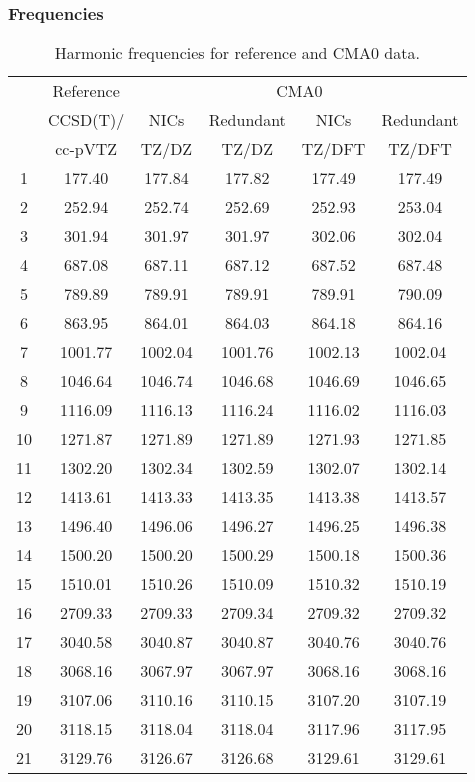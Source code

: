 \documentclass[10pt,oneside]{article}
\begin{document}
\begin{table}[h!]
\subsubsection*{Frequencies}
\centering
\caption{Harmonic frequencies for reference and CMA0 data.}
\begin{tabular}{cccccc}
\toprule
{} & Reference & \multicolumn{4}{c}{CMA0} \\
{} &  CCSD(T)/ &    NICs &  Redundant &    NICs & Redundant \\
{} &   cc-pVTZ &   TZ/DZ &      TZ/DZ &  TZ/DFT &    TZ/DFT \\
\midrule
1  &    177.40 &  177.84 &     177.82 &  177.49 &    177.49 \\
2  &    252.94 &  252.74 &     252.69 &  252.93 &    253.04 \\
3  &    301.94 &  301.97 &     301.97 &  302.06 &    302.04 \\
4  &    687.08 &  687.11 &     687.12 &  687.52 &    687.48 \\
5  &    789.89 &  789.91 &     789.91 &  789.91 &    790.09 \\
6  &    863.95 &  864.01 &     864.03 &  864.18 &    864.16 \\
7  &   1001.77 & 1002.04 &    1001.76 & 1002.13 &   1002.04 \\
8  &   1046.64 & 1046.74 &    1046.68 & 1046.69 &   1046.65 \\
9  &   1116.09 & 1116.13 &    1116.24 & 1116.02 &   1116.03 \\
10 &   1271.87 & 1271.89 &    1271.89 & 1271.93 &   1271.85 \\
11 &   1302.20 & 1302.34 &    1302.59 & 1302.07 &   1302.14 \\
12 &   1413.61 & 1413.33 &    1413.35 & 1413.38 &   1413.57 \\
13 &   1496.40 & 1496.06 &    1496.27 & 1496.25 &   1496.38 \\
14 &   1500.20 & 1500.20 &    1500.29 & 1500.18 &   1500.36 \\
15 &   1510.01 & 1510.26 &    1510.09 & 1510.32 &   1510.19 \\
16 &   2709.33 & 2709.33 &    2709.34 & 2709.32 &   2709.32 \\
17 &   3040.58 & 3040.87 &    3040.87 & 3040.76 &   3040.76 \\
18 &   3068.16 & 3067.97 &    3067.97 & 3068.16 &   3068.16 \\
19 &   3107.06 & 3110.16 &    3110.15 & 3107.20 &   3107.19 \\
20 &   3118.15 & 3118.04 &    3118.04 & 3117.96 &   3117.95 \\
21 &   3129.76 & 3126.67 &    3126.68 & 3129.61 &   3129.61 \\
\bottomrule
\end{tabular}
\end{table}
\end{document}
